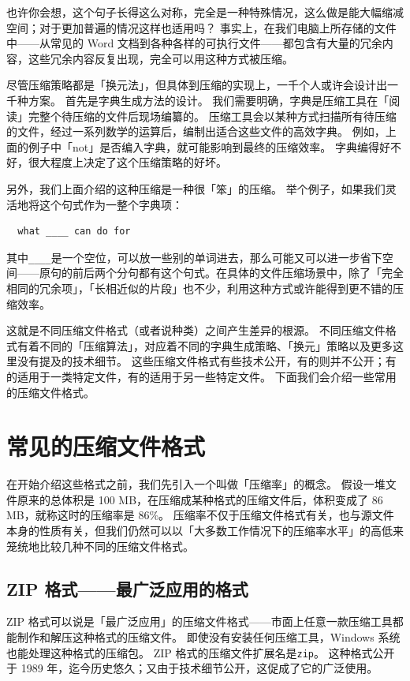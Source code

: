 也许你会想，这个句子长得这么对称，完全是一种特殊情况，这么做是能大幅缩减空间；对于更加普遍的情况这样也适用吗？
事实上，在我们电脑上所存储的文件中——从常见的 Word 文档到各种各样的可执行文件——都包含有大量的冗余内容，这些冗余内容反复出现，完全可以用这种方式被压缩。

尽管压缩策略都是「换元法」，但具体到压缩的实现上，一千个人或许会设计出一千种方案。
首先是字典生成方法的设计。
我们需要明确，字典是压缩工具在「阅读」完整个待压缩的文件后现场编纂的。
压缩工具会以某种方式扫描所有待压缩的文件，经过一系列数学的运算后，编制出适合这些文件的高效字典。
例如，上面的例子中「not」是否编入字典，就可能影响到最终的压缩效率。
字典编得好不好，很大程度上决定了这个压缩策略的好坏。

另外，我们上面介绍的这种压缩是一种很「笨」的压缩。
举个例子，如果我们灵活地将这个句式作为一整个字典项：

\begin{verbatim}
  what ____ can do for
\end{verbatim}

其中\verb|____|是一个空位，可以放一些别的单词进去，那么可能又可以进一步省下空间——原句的前后两个分句都有这个句式。在具体的文件压缩场景中，除了「完全相同的冗余项」，「长相近似的片段」也不少，利用这种方式或许能得到更不错的压缩效率。

这就是不同压缩文件格式（或者说种类）之间产生差异的根源。
不同压缩文件格式有着不同的「压缩算法」，对应着不同的字典生成策略、「换元」策略以及更多这里没有提及的技术细节。
这些压缩文件格式有些技术公开，有的则并不公开；有的适用于一类特定文件，有的适用于另一些特定文件。
下面我们会介绍一些常用的压缩文件格式。

\section{常见的压缩文件格式}

在开始介绍这些格式之前，我们先引入一个叫做「压缩率」的概念。
假设一堆文件原来的总体积是 100 MB，在压缩成某种格式的压缩文件后，体积变成了 86 MB，就称这时的压缩率是 86\%。
压缩率不仅于压缩文件格式有关，也与源文件本身的性质有关，但我们仍然可以以「大多数工作情况下的压缩率水平」的高低来笼统地比较几种不同的压缩文件格式。

\subsection{ZIP 格式——最广泛应用的格式}

ZIP 格式可以说是「最广泛应用」的压缩文件格式——市面上任意一款压缩工具都能制作和解压这种格式的压缩文件。
即使没有安装任何压缩工具，Windows 系统也能处理这种格式的压缩包。
ZIP 格式的压缩文件扩展名是\verb|zip|。
这种格式公开于 1989 年，迄今历史悠久；又由于技术细节公开，这促成了它的广泛使用。

